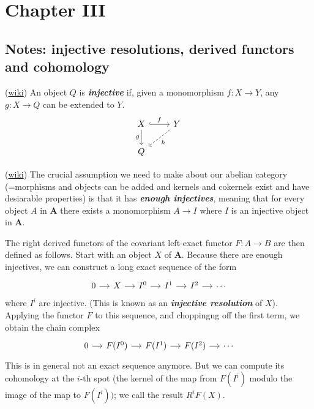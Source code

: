 \chapter{Chapter III}

\section{Notes: injective resolutions, derived functors and cohomology}
\begin{defn}
	(\href{https://en.wikipedia.org/wiki/Injective_object#:~:text=9%20References-,Definition,can%20be%20extended%20to%20Y%20.}{wiki}) An object $Q$ is \textit{\textbf{injective}} if, given a monomorphism $f:X\to Y$, any $g:X\to Q$ can be extended to $Y$.
\[\begin{tikzcd}
X\arrow[r,"f",hook]\arrow[d,"g",swap]&Y\arrow[dl,"h",dashed]\\
Q
\end{tikzcd}\]
\end{defn}

(\href{https://en.wikipedia.org/wiki/Derived_functor#Construction_and_first_properties}{wiki}) The crucial assumption we need to make about our abelian category (=morphisms and objects can be added and kernels and cokernels exist and have desiarable properties) is that it has  \textit{\textbf{enough injectives}}, meaning that for every object $A$ in $\mathbf{A}$ there exists a monomorphism $A\to I$ where $I$ is an injective object in $\mathbf{A}$.

The right derived functors of the covariant left-exact functor $F:A\to B$ are then defined as follows. Start with an object $X$ of $\mathbf{A}$. Because there are enough injectives, we can construct a long exact sequence of the form
\[\begin{tikzcd}[column sep=small]
	0\arrow[r]&X\arrow[r]&I^0\arrow[r]&I^1\arrow[r]&I^2\arrow[r]&\cdots
\end{tikzcd}\]
where $I^i$ are injective. (This is known as an \textit{\textbf{injective resolution}} of $X$). Applying the functor $F$ to this sequence, and choppingng off the first term, we obtain the chain complex
\[\begin{tikzcd}[column sep=small]
	0\arrow[r]&F(I^0)\arrow[r]&F(I^1)\arrow[r]&F(I^2)\arrow[r]&\cdots
\end{tikzcd}\]
This is in general not an exact sequence anymore. But we can compute its cohomology at the $i$-th spot (the kernel of the map from $F(I^i)$ modulo the image of the map to $F(I^i))$; we call the result $R^iF(X)$.

